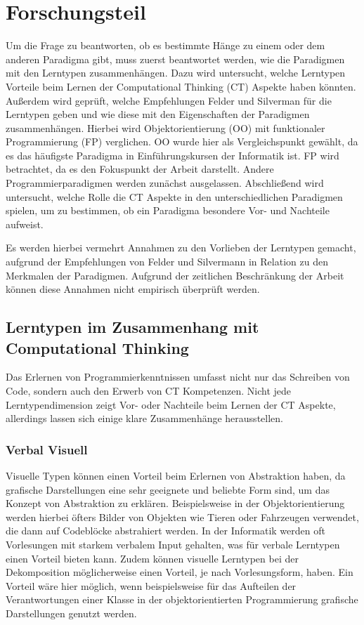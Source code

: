\clearpage
\section{Forschungsteil}
\label{sec:work}

Um die Frage zu beantworten, ob es bestimmte Hänge zu einem oder dem anderen Paradigma gibt, muss zuerst beantwortet werden, wie die Paradigmen mit den Lerntypen zusammenhängen. 
Dazu wird untersucht, welche Lerntypen Vorteile beim Lernen der Computational Thinking (CT) Aspekte haben könnten. Außerdem wird geprüft, welche Empfehlungen Felder und Silverman für die Lerntypen geben und wie diese mit den Eigenschaften der Paradigmen zusammenhängen.
Hierbei wird Objektorientierung (OO) mit funktionaler Programmierung (FP) verglichen. OO wurde hier als Vergleichspunkt gewählt, da es das häufigste Paradigma in Einführungskursen der Informatik ist. FP wird betrachtet, da es den Fokuspunkt der Arbeit darstellt. Andere Programmierparadigmen werden zunächst ausgelassen.
Abschließend wird untersucht, welche Rolle die CT Aspekte in den unterschiedlichen Paradigmen spielen, um zu bestimmen, ob ein Paradigma besondere Vor- und Nachteile aufweist.

Es werden hierbei vermehrt Annahmen zu den Vorlieben der Lerntypen gemacht, aufgrund der Empfehlungen von Felder und Silvermann in Relation zu den Merkmalen der Paradigmen. Aufgrund der zeitlichen Beschränkung der Arbeit können diese Annahmen nicht empirisch überprüft werden.

\subsection{Lerntypen im Zusammenhang mit Computational Thinking}
Das Erlernen von Programmierkenntnissen umfasst nicht nur das Schreiben von Code, sondern auch den Erwerb von CT Kompetenzen.
Nicht jede Lerntypendimension zeigt Vor- oder Nachteile beim Lernen der CT Aspekte, allerdings lassen sich einige klare Zusammenhänge herausstellen.

\subsubsection{Verbal Visuell}
Visuelle Typen können einen Vorteil beim Erlernen von Abstraktion haben, da grafische Darstellungen eine sehr geeignete und beliebte Form sind, um das Konzept von Abstraktion zu erklären. Beispielsweise in der Objektorientierung werden hierbei öfters Bilder von Objekten wie Tieren oder Fahrzeugen verwendet, die dann auf Codeblöcke abstrahiert werden.
In der Informatik werden oft Vorlesungen mit starkem verbalem Input gehalten, was für verbale Lerntypen einen Vorteil bieten kann.
Zudem können visuelle Lerntypen bei der Dekomposition möglicherweise einen Vorteil, je nach Vorlesungsform, haben. Ein Vorteil wäre hier möglich, wenn beispielsweise für das Aufteilen der Verantwortungen einer Klasse in der objektorientierten Programmierung grafische Darstellungen genutzt werden.

